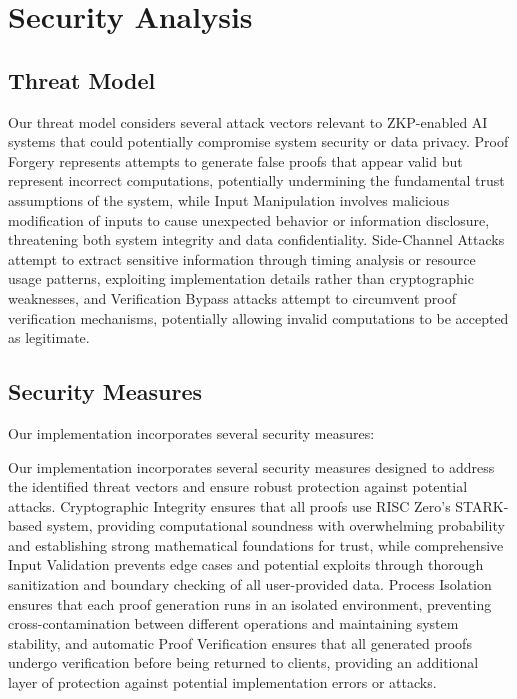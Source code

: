\documentclass[11pt]{article}
\begin{document}
\section{Security Analysis}
\label{sec:security}

\subsection{Threat Model}

Our threat model considers several attack vectors relevant to ZKP-enabled AI systems that could potentially compromise system security or data privacy. Proof Forgery represents attempts to generate false proofs that appear valid but represent incorrect computations, potentially undermining the fundamental trust assumptions of the system, while Input Manipulation involves malicious modification of inputs to cause unexpected behavior or information disclosure, threatening both system integrity and data confidentiality. Side-Channel Attacks attempt to extract sensitive information through timing analysis or resource usage patterns, exploiting implementation details rather than cryptographic weaknesses, and Verification Bypass attacks attempt to circumvent proof verification mechanisms, potentially allowing invalid computations to be accepted as legitimate.

\subsection{Security Measures}

Our implementation incorporates several security measures:

Our implementation incorporates several security measures designed to address the identified threat vectors and ensure robust protection against potential attacks. Cryptographic Integrity ensures that all proofs use RISC Zero's STARK-based system, providing computational soundness with overwhelming probability and establishing strong mathematical foundations for trust, while comprehensive Input Validation prevents edge cases and potential exploits through thorough sanitization and boundary checking of all user-provided data. Process Isolation ensures that each proof generation runs in an isolated environment, preventing cross-contamination between different operations and maintaining system stability, and automatic Proof Verification ensures that all generated proofs undergo verification before being returned to clients, providing an additional layer of protection against potential implementation errors or attacks.
\end{document}
